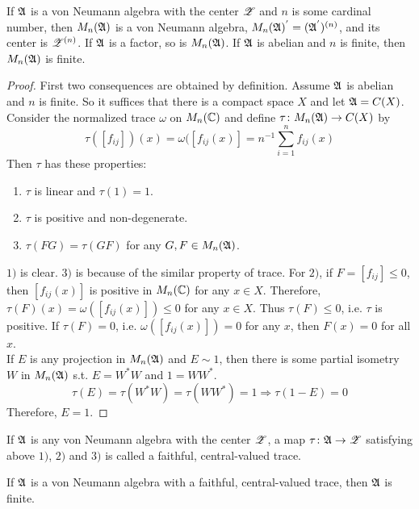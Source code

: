\begin{prop}
	If $\mathfrak{A}$ is a von Neumann algebra with the center $\mathscr{Z}$ and $n$ is some cardinal number, then $M_n(\mathfrak{A})$ is a von Neumann algebra, $M_n(\mathfrak{A})^{'} = (\mathfrak{A}^{'})^{(n)}$, and its center is $\mathscr{Z}^{(n)}$. If $\mathfrak{A}$ is a factor, so is $M_n(\mathfrak{A})$. If $\mathfrak{A}$ is abelian and $n$ is finite, then $M_n(\mathfrak{A})$ is finite.
\end{prop}
\begin{proof}
	First two consequences are obtained by definition. Assume $\mathfrak{A}$ is abelian and $n$ is finite. So it suffices that there is a compact space $X$ and let $\mathfrak{A} = C(X)$. Consider the normalized trace $\omega$ on $M_n(\mathbb{C})$ and define $\tau \colon M_n(\mathfrak{A}) \rightarrow C(X)$ by 
	\begin{equation*}
		\tau([f_{ij}])(x) = \omega([f_{ij}(x)] = n^{-1}\sum_{i=1}^n f_{ij}(x)
	\end{equation*}
	Then $\tau$ has these properties:
	\begin{enumerate}[label=\arabic*)]
		\item $\tau$ is linear and $\tau(1)=1$.
		\item $\tau$ is positive and non-degenerate.
		\item $\tau(FG) = \tau(GF)$ for any $G,F \in M_n(\mathfrak{A})$.
	\end{enumerate}
	$1)$ is clear. $3)$ is because of the similar property of trace. For $2)$, if $F = [f_{ij}] \leqslant 0$, then $[f_{ij}(x)]$ is positive in $M_n(\mathbb{C})$ for any $x \in X$. Therefore, $\tau(F)(x) = \omega([f_{ij}(x)]) \leqslant 0$ for any $x \in X$. Thus $\tau(F) \leqslant 0$, i.e. $\tau$ is positive. If $\tau(F) = 0$, i.e. $ \omega([f_{ij}(x)]) = 0$ for any $x$, then $F(x) = 0$ for all $x$.\\
	If $E$ is any projection in  $M_n(\mathfrak{A})$ and $E \sim 1$, then there is some partial isometry $W$ in $M_n(\mathfrak{A})$ s.t. $E = W^{*}W$ and $1 = WW^{*}$. 
	\begin{equation*}
		\tau(E) = \tau(W^{*}W) = \tau(WW^{*}) = 1 \Rightarrow \tau(1 - E) = 0
	\end{equation*}
	Therefore, $E = 1$.
\end{proof}
\begin{rem}
	If $\mathfrak{A}$ is any von Neumann algebra with the center $\mathscr{Z}$, a map $\tau \colon \mathfrak{A} \rightarrow \mathscr{Z}$ satisfying above $1)$, $2)$ and $3)$ is called a faithful, central-valued trace.
\end{rem}

\begin{cor}
	If $\mathfrak{A}$ is a von Neumann algebra with a faithful, central-valued trace, then $\mathfrak{A}$ is finite.
\end{cor}

